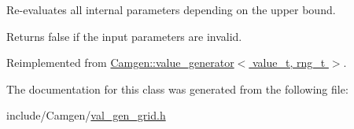 Re-\/evaluates all internal parameters depending on the upper bound. 

Returns false if the input parameters are invalid. 

Reimplemented from \hyperlink{a00577_ab36b05cba8bbc97a7ace38ae7edf58d8}{Camgen\+::value\+\_\+generator$<$ value\+\_\+t, rng\+\_\+t $>$}.



The documentation for this class was generated from the following file\+:\begin{DoxyCompactItemize}
\item 
include/\+Camgen/\hyperlink{a00830}{val\+\_\+gen\+\_\+grid.\+h}\end{DoxyCompactItemize}

